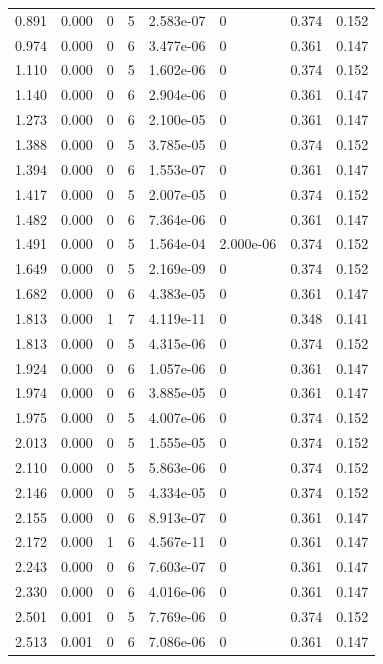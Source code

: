 \documentclass[preview]{standalone}
\begin{document}
{{\begin{tabular}{L{1.2cm}C{1.2cm} C{0.3cm}C{0.5cm} C{1.4cm}C{1.4cm} C{1.4cm}C{1.4cm}}
  0.891  &  0.000  & 0     &  5 &  2.583e-07  & 0  & 0.374 &  0.152   \\ 
  0.974  &  0.000  & 0     &  6 &  3.477e-06  & 0  & 0.361 &  0.147   \\ 
  1.110  &  0.000  & 0     &  5 &  1.602e-06  & 0  & 0.374 &  0.152   \\ 
  1.140  &  0.000  & 0     &  6 &  2.904e-06  & 0  & 0.361 &  0.147   \\ 
  1.273  &  0.000  & 0     &  6 &  2.100e-05  & 0  & 0.361 &  0.147   \\ 
  1.388  &  0.000  & 0     &  5 &  3.785e-05  & 0  & 0.374 &  0.152   \\ 
  1.394  &  0.000  & 0     &  6 &  1.553e-07  & 0  & 0.361 &  0.147   \\ 
  1.417  &  0.000  & 0     &  5 &  2.007e-05  & 0  & 0.374 &  0.152   \\ 
  1.482  &  0.000  & 0     &  6 &  7.364e-06  & 0  & 0.361 &  0.147   \\ 
  1.491  &  0.000  & 0     &  5 &  1.564e-04  & 2.000e-06  & 0.374 &  0.152   \\ 
  1.649  &  0.000  & 0     &  5 &  2.169e-09  & 0  & 0.374 &  0.152   \\ 
  1.682  &  0.000  & 0     &  6 &  4.383e-05  & 0  & 0.361 &  0.147   \\ 
  1.813  &  0.000  & 1     &  7 &  4.119e-11  & 0  & 0.348 &  0.141   \\ 
  1.813  &  0.000  & 0     &  5 &  4.315e-06  & 0  & 0.374 &  0.152   \\ 
  1.924  &  0.000  & 0     &  6 &  1.057e-06  & 0  & 0.361 &  0.147   \\ 
  1.974  &  0.000  & 0     &  6 &  3.885e-05  & 0  & 0.361 &  0.147   \\ 
  1.975  &  0.000  & 0     &  5 &  4.007e-06  & 0  & 0.374 &  0.152   \\ 
  2.013  &  0.000  & 0     &  5 &  1.555e-05  & 0  & 0.374 &  0.152   \\ 
  2.110  &  0.000  & 0     &  5 &  5.863e-06  & 0  & 0.374 &  0.152   \\ 
  2.146  &  0.000  & 0     &  5 &  4.334e-05  & 0  & 0.374 &  0.152   \\ 
  2.155  &  0.000  & 0     &  6 &  8.913e-07  & 0  & 0.361 &  0.147   \\ 
  2.172  &  0.000  & 1     &  6 &  4.567e-11  & 0  & 0.361 &  0.147   \\ 
  2.243  &  0.000  & 0     &  6 &  7.603e-07  & 0  & 0.361 &  0.147   \\ 
  2.330  &  0.000  & 0     &  6 &  4.016e-06  & 0  & 0.361 &  0.147   \\ 
  2.501  &  0.001  & 0     &  5 &  7.769e-06  & 0  & 0.374 &  0.152   \\ 
  2.513  &  0.001  & 0     &  6 &  7.086e-06  & 0  & 0.361 &  0.147   \\ 
\hline 
\end{tabular} 

}}
\end{document}
